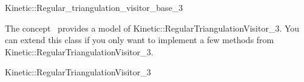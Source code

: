 

\begin{ccRefClass}{Kinetic::Regular_triangulation_visitor_base_3}


\ccDefinition
  
The concept \ccRefName\ provides a model of
Kinetic::RegularTriangulationVisitor\_3. You can extend this class if you only
want to implement a few methods from Kinetic::RegularTriangulationVisitor\_3.

\ccIsModel

Kinetic::RegularTriangulationVisitor\_3

\ccCreation
{}  %


\ccSeeAlso



\end{ccRefClass}


